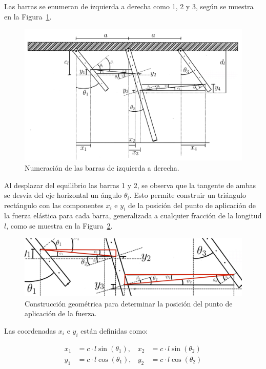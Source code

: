 Las barras se enumeran de izquierda a derecha como 1, 2 y 3, según se muestra en la Figura~\ref{fig:enumeracion_barras}.

\begin{figure}[h]
    \centering
    \includegraphics[width=1\textwidth]{Figures/Ilustración_sin_título 4.pdf}
    \caption{Numeración de las barras de izquierda a derecha.}
    \label{fig:enumeracion_barras}
\end{figure}

Al desplazar del equilibrio las barras 1 y 2, se observa que la tangente de ambas se desvía del eje horizontal un ángulo \(\theta_i\). Esto permite construir un triángulo rectángulo con las componentes \(x_i\) e \(y_i\) de la posición del punto de aplicación de la fuerza elástica para cada barra, generalizada a cualquier fracción de la longitud \(l\), como se muestra en la Figura~\ref{fig:triangulo_posicion}.

\begin{figure}[h]
    \centering
    \includegraphics[width=1\textwidth]{Figures/Ilustración_sin_título 5.pdf}
    \caption{Construcción geométrica para determinar la posición del punto de aplicación de la fuerza.}
    \label{fig:triangulo_posicion}
\end{figure}

Las coordenadas \(x_i\) e \(y_i\) están definidas como:

\begin{align}
x_1 &= c \cdot l \sin(\theta_{1}), & x_2 &= c \cdot l \sin(\theta_{2}) \\
y_1 &= c \cdot l \cos(\theta_{1}), & y_2 &= c \cdot l \cos(\theta_{2})
\end{align}

